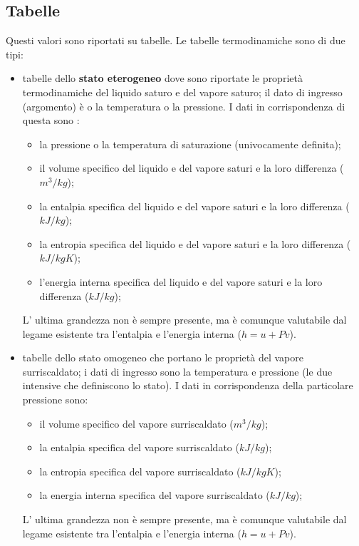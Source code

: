 \subsection{Tabelle}
Questi valori sono riportati su tabelle. Le tabelle termodinamiche sono di due tipi: 
\begin{itemize}
    \item  tabelle dello \textbf{stato eterogeneo} dove sono riportate le proprietà termodinamiche del liquido
    saturo e del vapore saturo; il dato di ingresso (argomento) è o la temperatura o la pressione. \newline
    I dati in corrispondenza di questa sono : \newline
    \begin{itemize}
        \item la pressione o la temperatura di saturazione (univocamente definita); 
        \item il volume specifico del liquido e del vapore saturi e la loro differenza ($m^3/kg$); 
        \item la entalpia specifica del liquido e del vapore saturi e la loro differenza ($kJ/kg$);
        \item la entropia specifica del liquido e del vapore saturi e la loro differenza ($kJ/kgK$);
        \item l'energia interna specifica del liquido e del vapore saturi e la loro differenza ($kJ/kg$);
    \end{itemize}
    L' ultima grandezza non è sempre presente, ma è comunque valutabile dal legame
    esistente tra l’entalpia e l’energia interna ($h= u+ Pv$). 
    \item tabelle dello stato omogeneo che portano le proprietà del vapore surriscaldato; i dati di
    ingresso sono la temperatura e pressione (le due intensive che definiscono lo stato).\newline
    I dati in
    corrispondenza della particolare pressione sono:
    \begin{itemize}
        \item il volume specifico del vapore surriscaldato ($m^3/kg$);
        \item la entalpia specifica del vapore surriscaldato ($kJ/kg$);
        \item la entropia specifica del vapore surriscaldato ($kJ/kgK$);
        \item la energia interna specifica del vapore surriscaldato ($kJ/kg$);
    \end{itemize}
    L' ultima grandezza non è sempre presente, ma è comunque valutabile dal legame
    esistente tra l’entalpia e l’energia interna ($h= u+ Pv$). 
\end{itemize}
